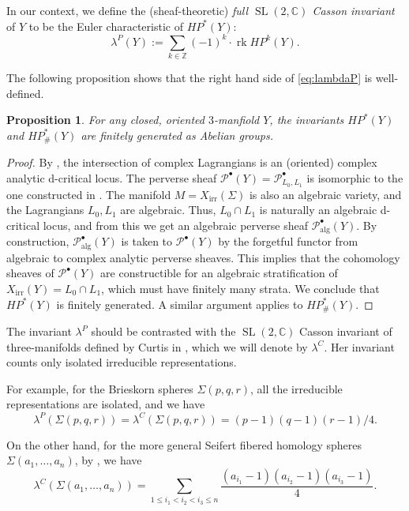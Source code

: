 \documentclass [11pt]{amsart}
\newtheorem {proposition}[theorem]{Proposition}
\theoremstyle{remark}
\def\zz {{\mathbb{Z}}}
\def\cc {{\mathbb{C}}}
\def\Z {\zz}
\def\HP{\mathit{HP}}
\def\sl {{\operatorname{SL}(2, \cc)}}
\def\Char {X}
\def\CharIrr {\Char_{\operatorname{irr}}}
\def\rk {\operatorname{rk }}
\def\HPf{\HP_{\! \#}}
\def\Pb {\mathcal{P}^\bullet}
\begin{document}
In our context, we define the (sheaf-theoretic) {\em full $\sl$ Casson invariant} of $Y$ to be the Euler characteristic of $\HP^*(Y)$:
\begin{equation}
\label{eq:lambdaP}
 \lambda^P(Y) := \sum_{k \in \Z} (-1)^k \cdot \rk \HP^k(Y).
\end{equation}

The following proposition shows that the right hand side of \eqref{eq:lambdaP} is well-defined. 

\begin{proposition}
For any closed, oriented $3$-manfiold $Y$, the invariants $\HP^*(Y)$ and $\HPf^*(Y)$ are finitely generated as Abelian groups.
\end{proposition}

\begin{proof}
 By \cite[Theorem 3.1]{Bussi}, the intersection of complex Lagrangians is an (oriented) complex analytic d-critical locus. The perverse sheaf $\Pb(Y) = \Pb_{L_0, L_1}$ is isomorphic to the one constructed in \cite[Theorem 6.9]{BBDJS}. The manifold $M=\CharIrr(\Sigma)$ is also an algebraic variety, and the Lagrangians $L_0, L_1$ are algebraic. Thus, $L_0 \cap L_1$ is naturally an algebraic d-critical locus, and from this we get an algebraic perverse sheaf $\Pb_{\operatorname{alg}}(Y)$. By construction, $\Pb_{\operatorname{alg}}(Y)$ is taken to $\Pb(Y)$ by the forgetful functor from algebraic to complex analytic perverse sheaves. This implies that the cohomology sheaves of $\Pb(Y)$ are constructible for an algebraic stratification of $\CharIrr(Y)= L_0 \cap L_1$, which must have finitely many strata. We conclude that $\HP^*(Y)$ is finitely generated. A similar argument applies to $\HPf^*(Y)$.
\end{proof}


The invariant $\lambda^P$ should be contrasted with the $\sl$ Casson invariant of three-manifolds defined by Curtis in \cite{Curtis}, which we will denote by $\lambda^C$. Her invariant counts only isolated irreducible representations. 

For example, for the Brieskorn spheres $\Sigma(p,q,r)$, all the irreducible representations are isolated, and we have
$$\lambda^P(\Sigma(p,q,r)) = \lambda^C(\Sigma(p,q,r)) = (p-1)(q-1)(r-1)/4.$$

On the other hand, for the more general Seifert fibered homology spheres $\Sigma(a_1, \dots, a_n)$, by \cite[Theorem 2.7]{BodenCurtis}, we have
$$\lambda^C(\Sigma(a_1, \dots, a_n)) = \sum_{1 \leq i_1 < i_2 < i_3 \leq n} \frac{(a_{i_1} - 1)(a_{i_2}-1)(a_{i_3}-1)}{4}.$$
\end{document}
